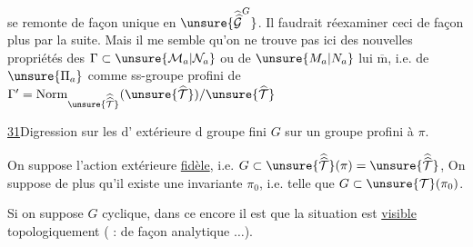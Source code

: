 se remonte de façon unique en
$\unsure{\widehat{\widehat{\mathcal G}}^{G}}$.
Il faudrait réexaminer ceci de façon plus  par la suite.
Mais il me semble qu'on ne trouve pas ici des nouvelles propriétés des
$\Gamma\subset\unsure{\mathcal M_a|\mathcal N_a}$ ou de
$\unsure{M_a|N_a}$ lui $\overline{\mathrm m}$, i.e. de
$\unsure{\Pi_a}$ comme ss-groupe profini de
$\Gamma'=\operatorname{Norm}_{\unsure{\widehat{\widehat{\mathcal T}}}}
(\unsure{\widehat{\mathcal T}})/\unsure{\widehat{\mathcal T}}$

\uline{31}\quad Digression sur les 
d'  extérieure
d groupe fini $G$ sur un
groupe profini à  $\pi$.

On suppose l'action extérieure \uline{fidèle},
i.e. $G\subset\unsure{\widehat{\widehat{\mathcal T}}}(\pi)
=\unsure{\widehat{\widehat{\mathcal T}}}$,
On suppose de plus qu'il existe une 
invariante $\pi_0$, i.e. telle que
$G\subset\unsure{\mathcal T}(\pi_0)$.

Si on suppose $G$ cyclique, dans ce 
encore il est  que la situation est
\uline{visible} topologiquement ( :
\uline{} de façon analytique  $\ldots$).

